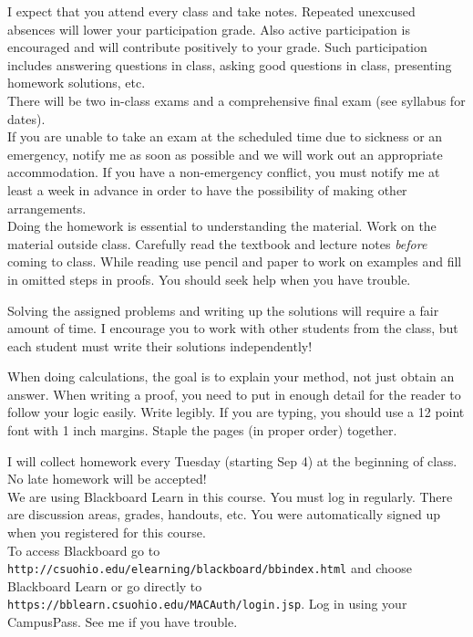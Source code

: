 \documentclass[11pt]{article}
\begin{document}
I expect that  you attend every class and take notes. Repeated
unexcused absences will lower your participation grade.
Also active participation is encouraged and will contribute
positively to your grade. Such participation includes answering
questions in class, asking good questions in class, presenting
homework solutions, etc. \\

There will be two in-class exams and a comprehensive final exam (see
syllabus for dates). \\

If you are unable to take an exam at the scheduled time due to
sickness or an emergency, notify me as soon as possible and we will
work out an appropriate accommodation. If you have a non-emergency
conflict, you must notify me at least a week in
advance in order to have the possibility of making other arrangements.\\

Doing the homework is essential to understanding the material. 
Work on the material outside class. Carefully read the textbook and lecture notes {\it before}
coming to class. While reading use pencil and paper to work on examples and fill in
omitted steps in proofs.  You should seek help when you have trouble.

Solving the assigned problems and writing up the solutions will require a fair amount of time.
I encourage you to work with other students from the class, but each student
must write their solutions independently! 

 When doing calculations, the goal is to explain your
method, not just obtain an answer. When writing a proof, you need to put in enough detail
for the reader to follow your logic easily.
Write legibly. If you are typing, you should use a 12 point
font with 1 inch margins. Staple the pages (in proper order) together.

I will collect homework every Tuesday (starting Sep 4) at the beginning of class. 
No late homework will be accepted!\\



 
 We are using Blackboard Learn in this course.
You must log in regularly. There are discussion areas,
grades, handouts, etc. You were automatically signed up when
you registered for this course.\\ To access Blackboard go to
{\tt http://csuohio.edu/elearning/blackboard/bbindex.html} and choose Blackboard Learn
or go directly to
{\tt https://bblearn.csuohio.edu/MACAuth/login.jsp}. Log in using your
CampusPass. See me if you have trouble.\\
\end{document}
